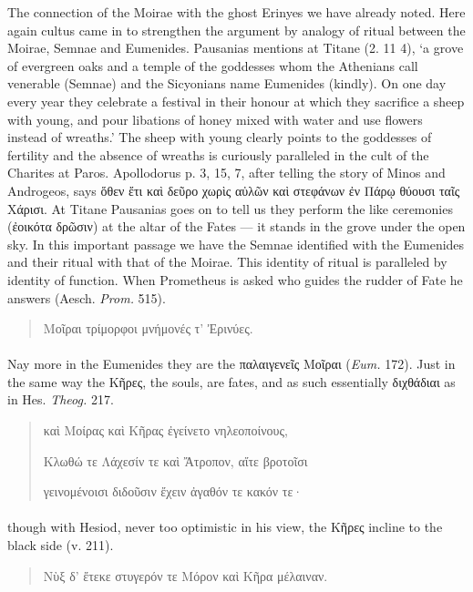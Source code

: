 \documentclass[a4paper, 11pt, oneside, polutonikogreek, english]{article}
\begin{document}
The connection of the Moirae with the ghost Erinyes we have already noted. Here again cultus came in to strengthen the argument by analogy of ritual between the Moirae, Semnae and Eumenides. Pausanias mentions at Titane (2. 11 4), `a grove of evergreen oaks and a temple of the goddesses whom the Athenians call venerable (Semnae) and the Sicyonians name Eumenides (kindly). On one day every year they celebrate a festival in their honour at which they sacrifice a sheep with young, and pour libations of honey mixed with water and use flowers instead of wreaths.' The sheep with young clearly points to the goddesses of fertility and the absence of wreaths is curiously paralleled in the cult of the Charites at Paros. Apollodorus p. 3, 15, 7, after telling the story of Minos and Androgeos, says ὅθεν ἔτι καὶ δεῦρο χωρὶς αὐλῶν καὶ στεφάνων ἐν Πάρῳ θύουσι ταῖς Χάρισι. At Titane Pausanias goes on to tell us they perform the like ceremonies (ἐοικότα δρῶσιν) at the altar of the Fates --- it stands in the grove under the open sky. In this important passage we have the Semnae identified with the Eumenides and their ritual with that of the Moirae. This identity of ritual is paralleled by identity of function. When Prometheus is asked who guides the rudder of Fate he answers (Aesch. \emph{Prom.} 515).
\begin{quotation}
Μοῖραι τρίμορφοι μνήμονές τ' Ἐρινύες.
\end{quotation}
\paragraph{}
Nay more in the Eumenides they are the παλαιγενεῖς Μοῖραι (\emph{Eum.} 172). Just in the same way the Κῆρες, the souls, are fates, and as such essentially διχθάδιαι as in Hes. \emph{Theog.} 217.
\begin{quotation}
καὶ Μοίρας καὶ Κῆρας ἐγείνετο νηλεοποίνους,

Κλωθώ τε Λάχεσίν τε καὶ Ἄτροπον, αἴτε βροτοῖσι

γεινομένοισι διδοῦσιν ἔχειν ἀγαθόν τε κακόν τε·
\end{quotation}
\paragraph{}
though with Hesiod, never too optimistic in his view, the Κῆρες incline to the black side (v. 211).
\begin{quotation}
Νὺξ δ' ἔτεκε στυγερόν τε Μόρον καὶ Κῆρα μέλαιναν.
\end{quotation}
\end{document}
